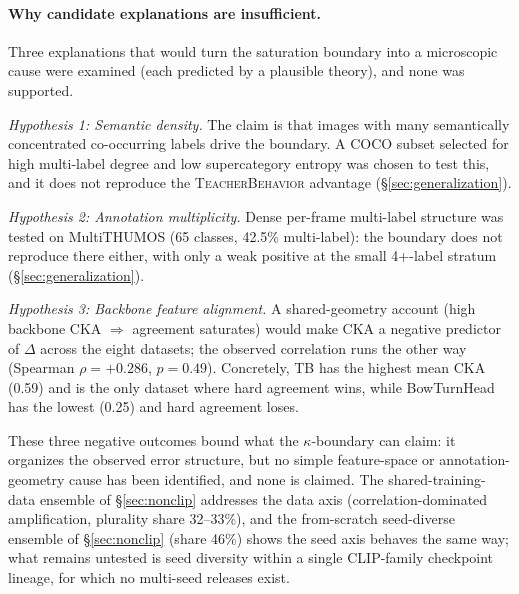 \documentclass[a4paper,fleqn]{cas-sc}
\newcommand{\tb}{\textsc{TeacherBehavior}}
\begin{document}
\paragraph{Why candidate explanations are insufficient.}
Three explanations that would turn the saturation boundary into a microscopic cause were examined (each predicted by a plausible theory), and none was supported.

\textit{Hypothesis 1: Semantic density.} The claim is that images with many semantically concentrated co-occurring labels drive the boundary. A COCO subset selected for high multi-label degree and low supercategory entropy was chosen to test this, and it does not reproduce the \tb{} advantage (\S\ref{sec:generalization}).

\textit{Hypothesis 2: Annotation multiplicity.} Dense per-frame multi-label structure was tested on MultiTHUMOS (65 classes, 42.5\% multi-label): the boundary does not reproduce there either, with only a weak positive at the small 4+-label stratum (\S\ref{sec:generalization}).

\textit{Hypothesis 3: Backbone feature alignment.} A shared-geometry account (high backbone CKA $\Rightarrow$ agreement saturates) would make CKA a negative predictor of $\Delta$ across the eight datasets; the observed correlation runs the other way (Spearman $\rho = +0.286$, $p = 0.49$). Concretely, TB has the highest mean CKA (0.59) and is the only dataset where hard agreement wins, while BowTurnHead has the lowest (0.25) and hard agreement loses.

These three negative outcomes bound what the $\kappa$-boundary can claim: it organizes the observed error structure, but no simple feature-space or annotation-geometry cause has been identified, and none is claimed.
The shared-training-data ensemble of \S\ref{sec:nonclip} addresses the data axis (correlation-dominated amplification, plurality share 32--33\%), and the from-scratch seed-diverse ensemble of \S\ref{sec:nonclip} (share 46\%) shows the seed axis behaves the same way; what remains untested is seed diversity within a single CLIP-family checkpoint lineage, for which no multi-seed releases exist.
\end{document}
